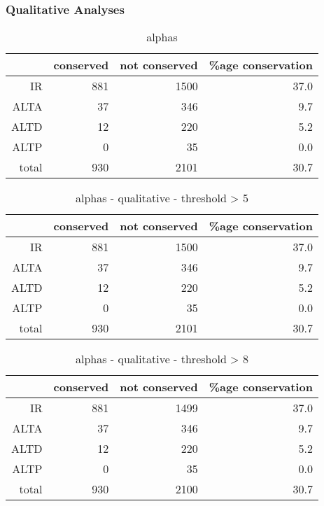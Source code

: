 \documentclass{article}
\begin{document}
\subsubsection*{Qualitative Analyses}

\begin{table}[ht]
\centering
\begin{tabular}{rrrr}
  \hline
 & conserved & not conserved & \%age conservation \\ 
  \hline
IR & 881 & 1500 & 37.0 \\ 
  ALTA & 37 & 346 & 9.7 \\ 
  ALTD & 12 & 220 & 5.2 \\ 
  ALTP & 0 & 35 & 0.0 \\ 
  total & 930 & 2101 & 30.7 \\ 
   \hline
\end{tabular}
\caption{alphas} 
\end{table}%
\begin{table}[ht]
\centering
\begin{tabular}{rrrr}
  \hline
 & conserved & not conserved & \%age conservation \\ 
  \hline
IR & 881 & 1500 & 37.0 \\ 
  ALTA & 37 & 346 & 9.7 \\ 
  ALTD & 12 & 220 & 5.2 \\ 
  ALTP & 0 & 35 & 0.0 \\ 
  total & 930 & 2101 & 30.7 \\ 
   \hline
\end{tabular}
\caption{alphas - qualitative - threshold > 5} 
\end{table}%
\begin{table}[ht]
\centering
\begin{tabular}{rrrr}
  \hline
 & conserved & not conserved & \%age conservation \\ 
  \hline
IR & 881 & 1499 & 37.0 \\ 
  ALTA & 37 & 346 & 9.7 \\ 
  ALTD & 12 & 220 & 5.2 \\ 
  ALTP & 0 & 35 & 0.0 \\ 
  total & 930 & 2100 & 30.7 \\ 
   \hline
\end{tabular}
\caption{alphas - qualitative - threshold > 8} 
\end{table}%
\end{document}
